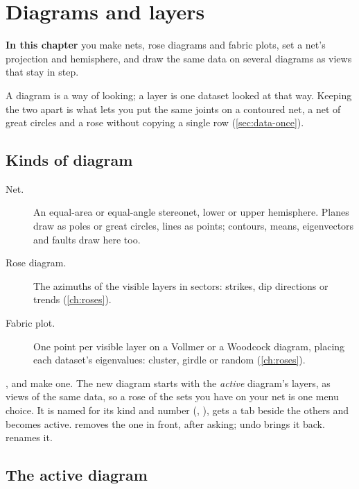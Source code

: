 \chapter{Diagrams and layers}\label{ch:diagrams}
\begin{goals}
\textbf{In this chapter} you make nets, rose diagrams and fabric plots, set a net's projection and
hemisphere, and draw the same data on several diagrams as views that stay in step.
\end{goals}

A diagram is a way of looking; a layer is one dataset looked at that way. Keeping the two apart is what
lets you put the same joints on a contoured net, a net of great circles and a rose without copying a
single row (\cref{sec:data-once}).

\section{Kinds of diagram}\label{sec:diagram-kinds}

\begin{description}
\item[Net.] An equal-area or equal-angle stereonet, lower or upper hemisphere. Planes draw as poles or
great circles, lines as points; contours, means, eigenvectors and faults draw here too.
\item[Rose diagram.] The azimuths of the visible layers in sectors: strikes, dip directions or trends
(\cref{ch:roses}).
\item[Fabric plot.] One point per visible layer on a Vollmer or a Woodcock diagram, placing each
dataset's eigenvalues: cluster, girdle or random (\cref{ch:roses}).
\end{description}

,  and  make one. The
new diagram starts with the \emph{active} diagram's layers, as views of the same data, so a rose of the
sets you have on your net is one menu choice. It is named for its kind and number (,
), gets a tab beside the others and becomes active. 
removes the one in front, after asking; undo brings it back.  renames it.

\section{The active diagram}\label{sec:active}

